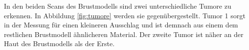 In den beiden Scans des Brustmodells sind zwei unterschiedliche Tumore zu erkennen.
In Abbildung \ref{fig:tumore} werden sie gegenübergestellt.
Tumor 1 sorgt in der Messung für einen kleineren Ausschlag und ist demnach aus einem dem restlichen Brustmodell ähnlicheren Material.
Der zweite Tumor ist näher an der Haut des Brustmodells als der Erste.